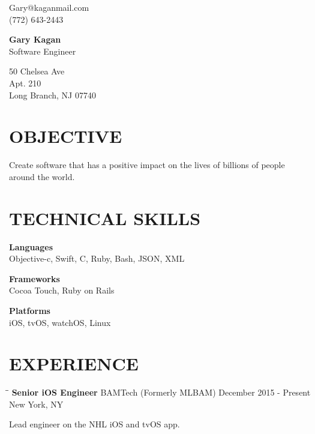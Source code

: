 \documentclass{res}
\begin{document}
\begin{multicols}{3}
\begin{flushleft}
Gary@kaganmail.com\\[0.3em]
(772) 643-2443
\end{flushleft}
\columnbreak
\begin{center}
{\huge\textbf{Gary Kagan}}\\
Software Engineer
\end{center}
\columnbreak
\begin{flushright}
50 Chelsea Ave\\
Apt. 210\\
Long Branch, NJ 07740
\end{flushright}
\end{multicols}


\begin{resume}
\section{OBJECTIVE}
    Create software that has a positive impact on the lives of billions of people around the world.

\section{TECHNICAL SKILLS}
    \textbf{Languages}\\
    Objective-c, Swift, C, Ruby, Bash, JSON, XML

    \begin{multicols}{2}
    \begin{flushleft}
    \textbf{Frameworks}\\
    Cocoa Touch, Ruby on Rails
    \end{flushleft}
    \columnbreak
    \textbf{Platforms}\\
    iOS, tvOS, watchOS, Linux
    \end{multicols}


\section{EXPERIENCE}
  \begin{tabbing}
  \hspace{2.3in}\= \hspace{2.6in}\= \kill %
   {\bf Senior iOS Engineer} \>BAMTech (Formerly MLBAM)     \>December 2015 - Present\\
                            \>New York, NY
  \end{tabbing}\vspace{-20pt}      %
    Lead engineer on the NHL iOS and tvOS app.


\end{resume}
\end{document}
